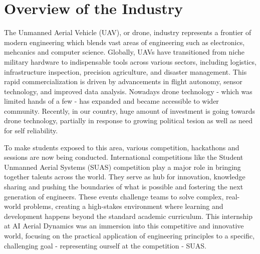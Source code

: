\chapter{Overview of the Industry}
The Unmanned Aerial Vehicle (UAV), or drone, industry represents a frontier of modern engineering which blends vast areas of engineering such as electronics, mehcanics and computer science. 
Globally, UAVs have transitioned from niche military hardware to indispensable tools across various sectors, including logistics, infrastructure inspection, precision agriculture, and disaster management.
This rapid commercialization is driven by advancements in flight autonomy, sensor technology, and improved data analysis.
Nowadays drone technology - which was limited hands of a few - has expanded and became accessible to wider community.
Recently, in our country, huge amount of investment is going towards drone technology,
partially in response to growing political tesion as well as need for self reliability.

To make students exposed to this area, various competition, hackathons and sessions are now being conducted.
International competitions like the Student Unmanned Aerial Systems (SUAS) competition play a major role in bringing together talents across the world.
They serve as hub for innovation, knowledge sharing and pushing the boundaries of what is possible and fostering the next generation of engineers.
These events challenge teams to solve complex, real-world problems, creating a high-stakes environment where learning and development happens beyond the standard academic curriculum.
This internship at AI Aerial Dynamics was an immersion into this competitive and innovative world, focusing on the practical application of engineering principles to a specific, challenging goal - representing ourself at the competition - SUAS.
